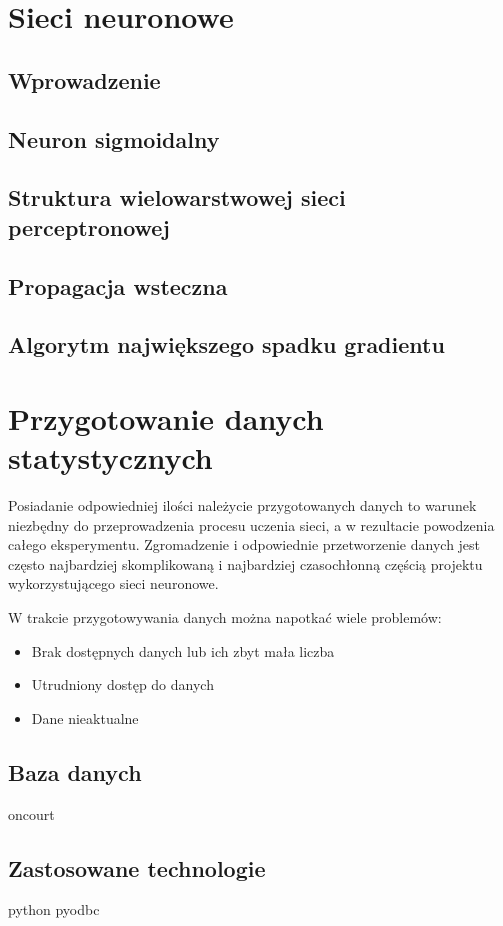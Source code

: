 \chapter{Sieci neuronowe}
\section{Wprowadzenie}
\section{Neuron sigmoidalny}
\section{Struktura wielowarstwowej sieci perceptronowej}
\section{Propagacja wsteczna}
\section{Algorytm największego spadku gradientu}

\chapter{Przygotowanie danych statystycznych}
Posiadanie odpowiedniej ilości należycie przygotowanych danych to warunek niezbędny do przeprowadzenia procesu uczenia sieci, a w rezultacie powodzenia całego eksperymentu. Zgromadzenie i odpowiednie przetworzenie danych jest często najbardziej skomplikowaną i najbardziej czasochłonną częścią projektu wykorzystującego sieci neuronowe. 

W trakcie przygotowywania danych można napotkać wiele problemów:
\begin{itemize}
\item Brak dostępnych danych lub ich zbyt mała liczba
\item Utrudniony dostęp do danych
\item Dane nieaktualne

\end{itemize}

\section{Baza danych}
oncourt
\section{Zastosowane technologie}
python
pyodbc
